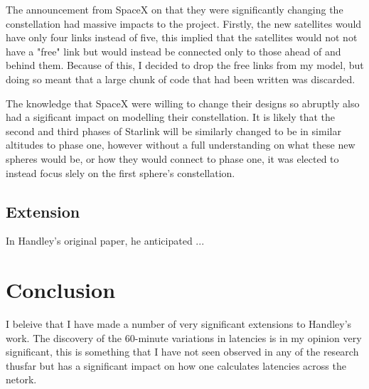 \documentclass[12pt]{article}
\begin{document}
The announcement from SpaceX on that they were significantly changing the constellation had massive impacts to the project. Firstly, the new satellites would have only four links instead of five, this implied that the satellites would not not have a "free" link but would instead be connected only to those ahead of and behind them. Because of this, I decided to drop the free links from my model, but doing so meant that a large chunk of code that had been written was discarded.

The knowledge that SpaceX were willing to change their designs so abruptly also had a sigificant impact on modelling their constellation. It is likely that the second and third phases of Starlink will be similarly changed to be in similar altitudes to phase one, however without a full understanding on what these new spheres would be, or how they would connect to phase one, it was elected to instead focus slely on the first sphere's constellation. %

\subsection{Extension}

In Handley's original paper, he anticipated ...

\section{Conclusion}

I beleive that I have made a number of very significant extensions to Handley's work. The discovery of the 60-minute variations in latencies is in my opinion very significant, this is something that I have not seen observed in any of the research thusfar but has a significant impact on how one calculates latencies across the netork.

\end{document}
